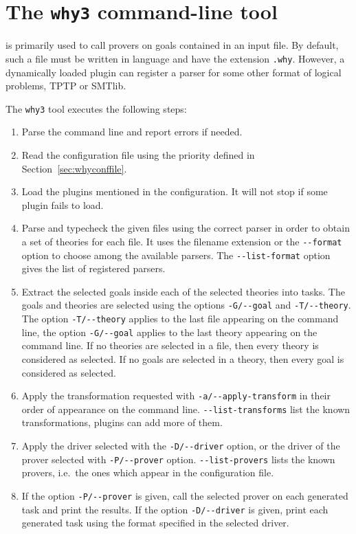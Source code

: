 \section{The \texttt{why3} command-line tool}
\label{sec:why3ref}

\why is primarily used to call provers on goals contained in an
input file. By default, such a file must be written in \why language
and have the extension \texttt{.why}. However, a dynamically loaded
plugin can register a parser for some other format of logical problems,
\eg{} TPTP or SMTlib.

The \texttt{why3} tool executes the following steps:
\begin{enumerate}
\item Parse the command line and report errors if needed.
\item Read the configuration file using the priority defined in
  Section~\ref{sec:whyconffile}.
\item Load the plugins mentioned in the configuration. It will not
  stop if some plugin fails to load.
\item Parse and typecheck the given files using the correct parser in order
  to obtain a set of \why theories for each file. It uses
  the filename extension or the \verb|--format| option to choose
  among the available parsers. The \verb|--list-format| option gives
  the list of registered parsers.
\item Extract the selected goals inside each of the selected theories
  into tasks. The goals and theories are selected using the options
  \verb|-G/--goal| and \verb|-T/--theory|. The option
  \verb|-T/--theory| applies to the last file appearing on the
  command line, the option \verb|-G/--goal| applies to the last theory
  appearing on the command line. If no theories are selected in a file,
  then every theory is considered as selected. If no goals are selected
  in a theory, then every goal is considered as selected.
\item Apply the transformation requested
  with \verb|-a/--apply-transform| in their order of appearance on the
  command line. \verb|--list-transforms| list the known
  transformations, plugins can add more of them.
\item Apply the driver selected with the \verb|-D/--driver| option,
  or the driver of the prover selected with \verb|-P/--prover|
  option. \verb|--list-provers| lists the known provers, i.e.~the ones
  which appear in the configuration file.
\item If the option \verb|-P/--prover| is given, call the selected prover
  on each generated task and print the results. If the option
  \verb|-D/--driver| is given, print each generated task using
  the format specified in the selected driver.
\end{enumerate}

